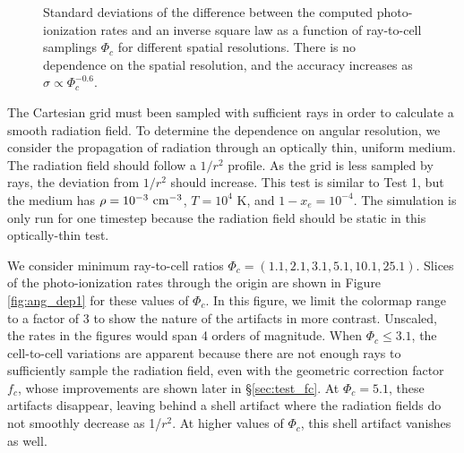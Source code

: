 \documentclass[useAMS,usenatbib]{mn2e}
\begin{document}
\begin{figure*}
  \caption{\label{fig:ang_dep1} Variations in the photo-ionization
    rates for different ray-to-cell samplings $\Phi_c$.  The colormap
    only spans a factor of 3 to enhance the contrast.  In comparison,
    the photo-ionization rate actually spans 4 orders of magnitude in
    this test.}
\end{figure*}

\begin{figure}
  \caption{\label{fig:ang_dep2} Standard deviations of the difference
    between the computed photo-ionization rates and an inverse square
    law as a function of ray-to-cell samplings $\Phi_c$ for different
    spatial resolutions.  There is no dependence on the spatial
    resolution, and the accuracy increases as $\sigma \propto
    \Phi_c^{-0.6}$.}
\end{figure}

The Cartesian grid must been sampled with sufficient rays in order to
calculate a smooth radiation field.  To determine the dependence on
angular resolution, we consider the propagation of radiation through
an optically thin, uniform medium.  The radiation field should follow
a $1/r^2$ profile.  As the grid is less sampled by rays, the deviation
from $1/r^2$ should increase.  This test is similar to Test 1, but the
medium has $\rho = 10^{-3}~\cubecm$, $T = 10^4$ K, and $1 - x_e =
10^{-4}$.  The simulation is only run for one timestep because the
radiation field should be static in this optically-thin test.

We consider minimum ray-to-cell ratios $\Phi_c = (1.1, 2.1, 3.1, 5.1,
10.1, 25.1)$.  Slices of the photo-ionization rates through the origin
are shown in Figure \ref{fig:ang_dep1} for these values of $\Phi_c$.
In this figure, we limit the colormap range to a factor of 3 to show
the nature of the artifacts in more contrast.  Unscaled, the rates in
the figures would span 4 orders of magnitude.  When $\Phi_c \le 3.1$,
the cell-to-cell variations are apparent because there are not enough
rays to sufficiently sample the radiation field, even with the
geometric correction factor $f_c$, whose improvements are shown later
in \S\ref{sec:test_fc}.  At $\Phi_c = 5.1$, these artifacts disappear,
leaving behind a shell artifact where the radiation fields do not
smoothly decrease as 1/$r^2$.  At higher values of $\Phi_c$, this
shell artifact vanishes as well.  
\end{document}
